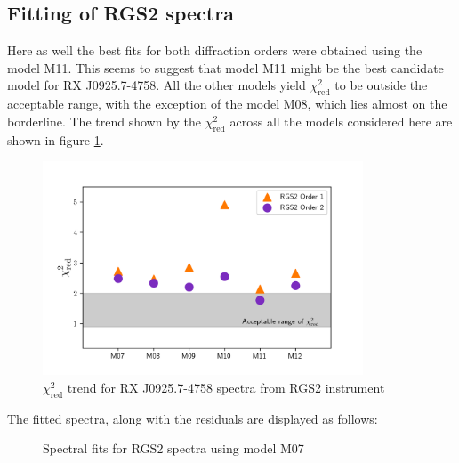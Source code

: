 		\clearpage
		\subsection{Fitting of RGS2 spectra} \label{hi-resolution:analysis:rgs2}
			Here as well the best fits for both diffraction orders were obtained using the model M11. This seems to suggest that model M11 might be the best candidate model for RX J0925.7-4758. All the other models yield $\chi^2_\text{red}$ to be outside the acceptable range, with the exception of the model M08, which lies almost on the borderline. The trend shown by the $\chi^2_\text{red}$ across all the models considered here are shown in figure \ref{fig:mrvel-rgs2-chisq}.
			
			\begin{figure}[h!]
				\centering
				\caption{$\chi^2_\text{red}$ trend for RX J0925.7-4758 spectra from RGS2 instrument}
				\label{fig:mrvel-rgs2-chisq}
				\includegraphics[width=0.85\textwidth]{mrvel-rgs2-chisq}
			\end{figure}
			The fitted spectra, along with the residuals are displayed as follows:
			\begin{figure}[h!]
				\centering
				\caption{Spectral fits for RGS2 spectra using model M07}
				\label{xmm:rgs2-m07}
			\end{figure}
